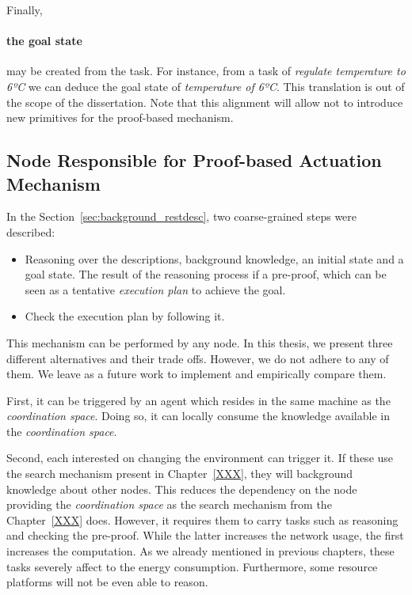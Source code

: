 Finally, \paragraph{the goal state} may be created from the task.
For instance, from a task of \emph{regulate temperature to 6ºC} we can deduce the goal state of \emph{temperature of 6ºC}.
This translation is out of the scope of the dissertation.
Note that this alignment will allow not to introduce new primitives for the proof-based mechanism.



\subsection{Node Responsible for Proof-based Actuation Mechanism}

In the Section~\ref{sec:background_restdesc}, two coarse-grained steps were described:
\begin{itemize}
  \item Reasoning over the descriptions, background knowledge, an initial state and a goal state.
        The result of the reasoning process if a pre-proof, which can be seen as a tentative \emph{execution plan} to achieve the goal.
  \item Check the execution plan by following it.
\end{itemize}


This mechanism can be performed by any node.
In this thesis, we present three different alternatives and their trade offs.
However, we do not adhere to any of them.
We leave as a future work to implement and empirically compare them.


First, it can be triggered by an agent which resides in the same machine as the \emph{coordination space}.
Doing so, it can locally consume the knowledge available in the \emph{coordination space}.


Second, each \Consumer{} interested on changing the environment can trigger it.
If these \Consumers{} use the search mechanism present in Chapter~\ref{XXX}, they will background knowledge about other nodes.
This reduces the dependency on the node providing the \emph{coordination space} as the search mechanism from the Chapter~\ref{XXX} does.
However, it requires them to carry tasks such as reasoning and checking the pre-proof.
While the latter increases the network usage, the first increases the computation.
As we already mentioned in previous chapters, these tasks severely affect to the energy consumption.
Furthermore, some resource platforms will not be even able to reason.


